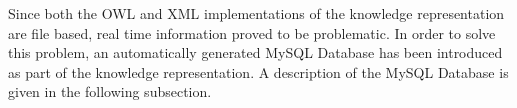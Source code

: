 %
%
%
%
%
Since both the OWL and XML implementations of the knowledge representation are file based, real time information proved to be problematic. In order to solve this problem, an automatically generated \textsf{MySQL Database} \cite{MySQL} has been introduced as part of the knowledge representation. A description of the \textsf{MySQL Database} is given in the following subsection.


